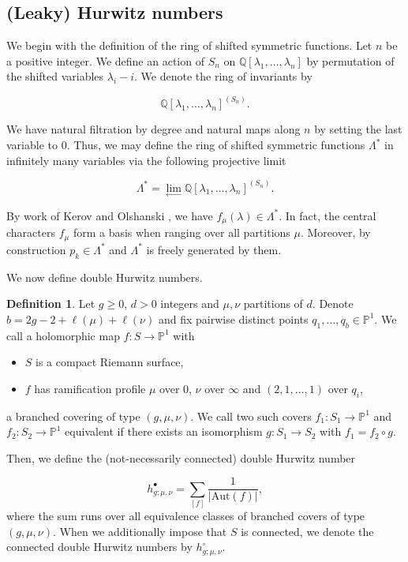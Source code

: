 \documentclass[10pt,a4paper,oneside,no-math,reqno]{amsart}%
\theoremstyle{plain}
\theoremstyle{definition}
\newtheorem{definition}[theorem]{Definition}
\theoremstyle{remark}
\numberwithin{equation}{section}
\newcommand{\1}{\mathds{1}}
\newcommand{\<}{\langle}
\renewcommand{\>}{\rangle}
\begin{document}
\subsection{(Leaky) Hurwitz numbers}
We begin with the definition of the ring of shifted symmetric functions. Let $n$ be a positive integer. We define an action of $S_n$ on $\mathbb{Q}[\lambda_1,\dots,\lambda_n]$ by permutation of the shifted variables $\lambda_i-i$. We denote the ring of invariants by

\begin{equation}
    \mathbb{Q}[\lambda_1,\dots,\lambda_n]^{(S_n)}.
\end{equation}

We have natural filtration by degree and natural maps along $n$ by setting the last variable to $0$. Thus, we may define the ring of shifted symmetric functions $\Lambda^\ast$ in infinitely many variables via the following projective limit

\begin{equation}
    \Lambda^\ast
    =
    \lim_{\leftarrow} \mathbb{Q}[\lambda_1,\dots,\lambda_n]^{(S_n)}.
\end{equation}


By work of Kerov and Olshanski \cite{Ker94}, we have $f_\mu(\lambda)\in\Lambda^\ast$. In fact, the central characters $f_\mu$ form a basis when ranging over all partitions $\mu$. Moreover, by construction $p_k\in\Lambda^\ast$ and $\Lambda^\ast$ is freely generated by them.


We now define double Hurwitz numbers.

\begin{definition}
Let $g\ge0$, $d>0$ integers and $\mu,\nu$ partitions of $d$. Denote $b=2g-2+\ell(\mu)+\ell(\nu)$ and fix pairwise distinct points $q_1,\dots,q_b\in\mathbb{P}^1$. We call a holomorphic map $f\colon S\to\mathbb{P}^1$ with
\begin{itemize}
    \item $S$ is a compact Riemann surface,
    \item $f$ has ramification profile $\mu$ over $0$, $\nu$ over $\infty$ and $(2,1,\dots,1)$ over $q_i$,
\end{itemize}
a branched covering of type $(g,\mu,\nu)$. We call two such covers $f_1\colon S_1\to\mathbb{P}^1$ and $f_2\colon S_2\to\mathbb{P}^1$ equivalent if there exists an isomorphism $g\colon S_1\to S_2$ with $f_1=f_2\circ g$.

Then, we define the (not-necessarily connected) double Hurwitz number

\begin{equation}
    h^\bullet_{g;\mu,\nu}
    =
    \sum_{[f]} \frac{1}{|\mathrm{Aut}(f)|},
\end{equation}
where the sum runs over all equivalence classes of branched covers of type $(g,\mu,\nu)$. When we additionally impose that $S$ is connected, we denote the connected double Hurwitz numbers by $h^\circ_{g;\mu,\nu}$.
\end{definition}
\end{document}

